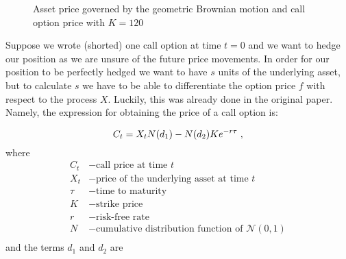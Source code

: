 \documentclass[times, utf8, diplomski]{fer}
\begin{document}
\begin{figure}[ht]
\centering

\caption{Asset price governed by the geometric Brownian motion and call option price with $K=120$}
\label{fig:gbm_price_process}	
\end{figure}
\noindent Suppose we wrote (shorted) one call option at time $t=0$ and we want to hedge our position as we are unsure of the future price movements. In order for our position to be perfectly hedged we want to have $s$ units of the underlying asset, but to calculate $s$ we have to be able to differentiate the option price $f$ with respect to the process $X$. Luckily, this was already done in the original \cite{black_pricing_1972} paper. Namely, the expression for obtaining the price of a call option is:

\begin{equation} \label{eqn:bs_call}
	C_t = X_tN(d_1) - N(d_2)Ke^{-r\tau} \hspace{0.1cm},
\end{equation}
where
\begin{align*}
	C_t &- \mbox{call price at time } t \\
	X_t &- \mbox{price of the underlying asset at time } t \\
	\tau &- \mbox{time to maturity} \\
	K &- \mbox{strike price} \\
	r &- \mbox{risk-free rate} \\
	N &- \mbox{cumulative distribution function of } \mathcal{N}(0,1) \\
\end{align*}
and the terms $d_1$ and $d_2$ are
\end{document}
